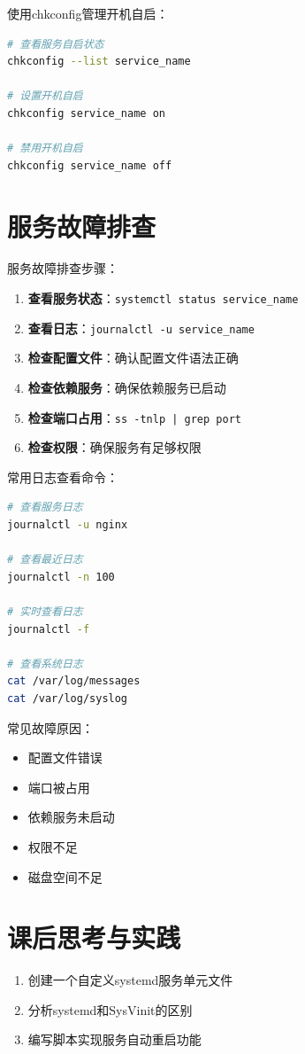 \documentclass[12pt,UTF8]{ctexbook}
\begin{document}
使用chkconfig管理开机自启：
\begin{lstlisting}[language=bash]
# 查看服务自启状态
chkconfig --list service_name

# 设置开机自启
chkconfig service_name on

# 禁用开机自启
chkconfig service_name off
\end{lstlisting}

\section{服务故障排查}
\label{sec:service-troubleshoot}

服务故障排查步骤：

\begin{enumerate}
    \item \textbf{查看服务状态}：\texttt{systemctl status service\_name}
    \item \textbf{查看日志}：\texttt{journalctl -u service\_name}
    \item \textbf{检查配置文件}：确认配置文件语法正确
    \item \textbf{检查依赖服务}：确保依赖服务已启动
    \item \textbf{检查端口占用}：\texttt{ss -tnlp | grep port}
    \item \textbf{检查权限}：确保服务有足够权限
\end{enumerate}

常用日志查看命令：
\begin{lstlisting}[language=bash]
# 查看服务日志
journalctl -u nginx

# 查看最近日志
journalctl -n 100

# 实时查看日志
journalctl -f

# 查看系统日志
cat /var/log/messages
cat /var/log/syslog
\end{lstlisting}

常见故障原因：
\begin{itemize}
    \item 配置文件错误
    \item 端口被占用
    \item 依赖服务未启动
    \item 权限不足
    \item 磁盘空间不足
\end{itemize}

\section{课后思考与实践}
\label{sec:service-practice}
\begin{enumerate}
    \item 创建一个自定义systemd服务单元文件
    \item 分析systemd和SysVinit的区别
    \item 编写脚本实现服务自动重启功能
\end{enumerate}
\end{document}
